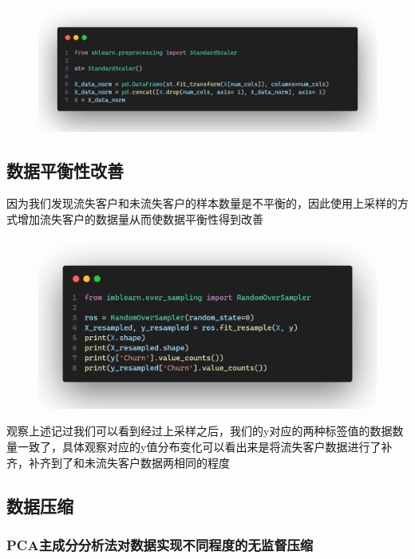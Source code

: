 \documentclass{article}
\begin{document}
\begin{figure}[H]
	\centering
	\includegraphics[width=\textwidth]{./img/normal.png}
\end{figure}

\subsection{数据平衡性改善}
因为我们发现流失客户和未流失客户的样本数量是不平衡的，因此使用上采样的方式增加流失客户的数据量从而使数据平衡性得到改善

\begin{figure}[H]
	\centering
	\includegraphics[width=\textwidth]{./img/resample.png}
\end{figure}

观察上述记过我们可以看到经过上采样之后，我们的y对应的两种标签值的数据数量一致了，具体观察对应的y值分布变化可以看出来是将流失客户数据进行了补齐，补齐到了和未流失客户数据两相同的程度


\subsection{数据压缩}

\subsubsection{PCA主成分分析法对数据实现不同程度的无监督压缩}
\end{document}
